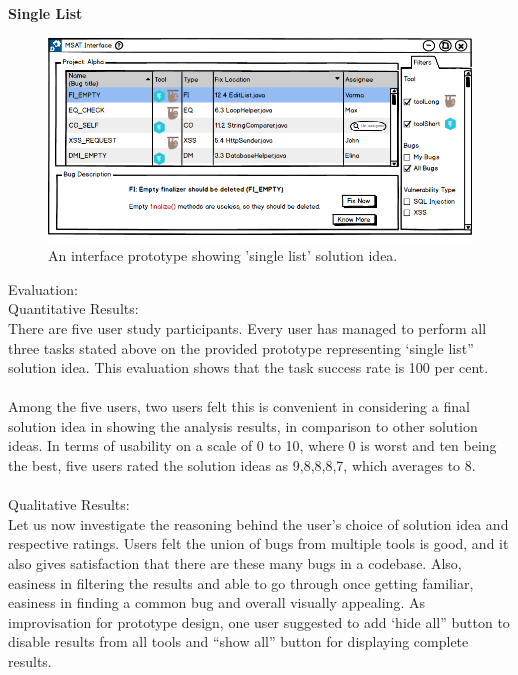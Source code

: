 \textbf{Single List}
\begin{figure}[hbt!]
	\centering
	\includegraphics[width=\linewidth]{figures/solution_ideas_snaps/S11_single_list}
	\caption{An interface prototype showing 'single list' solution idea.}
	\label{fig:S11_single_list}
\end{figure}


Evaluation: \\

Quantitative Results: \\

There are five user study participants. Every user has managed to perform all three tasks stated above on the provided prototype representing ‘single list” solution idea. This evaluation shows that the task success rate is 100 per cent. \\ \\

Among the five users, two users felt this is convenient in considering a final solution idea in showing the analysis results, in comparison to other solution ideas.  In terms of usability on a scale of 0 to 10, where 0 is worst and ten being the best, five users rated the solution ideas as 9,8,8,8,7, which averages to 8. \\ \\

Qualitative Results: \\

Let us now investigate the reasoning behind the user’s choice of solution idea and respective ratings. Users felt the union of bugs from multiple tools is good, and it also gives satisfaction that there are these many bugs in a codebase. Also, easiness in filtering the results and able to go through once getting familiar, easiness in finding a common bug and overall visually appealing. As improvisation for prototype design, one user suggested to add ‘hide all” button to disable results from all tools and “show all” button for displaying complete results. \\ \\


